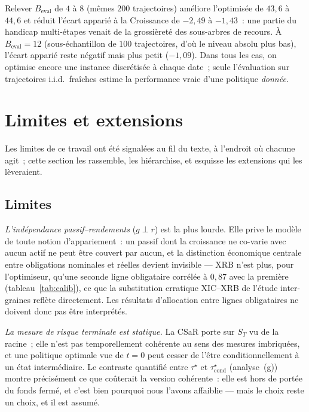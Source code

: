\documentclass[11pt,letterpaper]{article}
\newcommand{\taustar}{\tau^{\star}}
\theoremstyle{definition}
\begin{document}
Relever $B_{\mathrm{eval}}$ de $4$ à $8$ (mêmes $200$ trajectoires) améliore
l'optimisée de $43{,}6$ à $44{,}6$ et réduit l'écart apparié à la Croissance
de $-2{,}49$ à $-1{,}43$~: une partie du handicap multi-étapes venait de la
grossièreté des sous-arbres de recours. À $B_{\mathrm{eval}}=12$ (sous-échantillon
de $100$ trajectoires, d'où le niveau absolu plus bas), l'écart apparié reste
négatif mais plus petit ($-1{,}09$). Dans tous les cas, on optimise encore une
instance discrétisée à chaque date~; seule l'évaluation sur trajectoires
i.i.d.\ fraîches estime la performance vraie d'une politique \emph{donnée}.

\section{Limites et extensions}\label{sec:limites}

Les limites de ce travail ont été signalées au fil du texte, à l'endroit où
chacune agit~; cette section les rassemble, les hiérarchise, et esquisse les
extensions qui les lèveraient.

\subsection{Limites}\label{ssec:limites-liste}

\emph{L'indépendance passif--rendements} ($g \perp r$) est la plus lourde. Elle
prive le modèle de toute notion d'appariement~: un passif dont la croissance ne
co-varie avec aucun actif ne peut être couvert par aucun, et la distinction
économique centrale entre obligations nominales et réelles devient invisible
--- XRB n'est plus, pour l'optimiseur, qu'une seconde ligne obligataire
corrélée à $0{,}87$ avec la première (tableau~\ref{tab:calib}), ce que la
substitution erratique XIC--XRB de l'étude inter-graines reflète directement.
Les résultats d'allocation entre lignes obligataires ne doivent donc pas être
interprétés.

\emph{La mesure de risque terminale est statique.} La CSaR porte sur $S_T$ vu
de la racine~; elle n'est pas temporellement cohérente au sens des mesures
imbriquées, et une politique optimale vue de $t=0$ peut cesser de l'être
conditionnellement à un état intermédiaire. Le contraste quantifié entre
$\taustar$ et $\taustar_{\mathrm{cond}}$ (analyse~(g)) montre précisément ce
que coûterait la version cohérente~: elle est hors de portée du fonds fermé,
et c'est bien pourquoi nous l'avons affaiblie --- mais le choix reste un
choix, et il est assumé.
\end{document}

